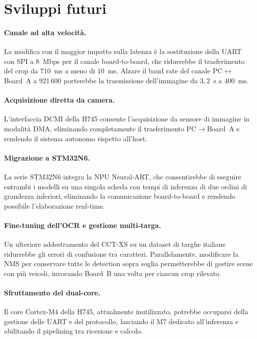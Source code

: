 \section{Sviluppi futuri}
\label{sec:sviluppi-futuri}

\paragraph{Canale ad alta velocità.} La modifica con il maggior impatto sulla latenza è la sostituzione della UART con SPI a $8$~Mbps per il canale board-to-board, che ridurrebbe il trasferimento del crop da $710$~ms a meno di $10$~ms. Alzare il baud rate del canale PC$\leftrightarrow$Board~A a $921\,600$ porterebbe la trasmissione dell'immagine da $3{,}2$~s a $400$~ms.

\paragraph{Acquisizione diretta da camera.} L'interfaccia DCMI della H745 consente l'acquisizione da sensore di immagine in modalità DMA, eliminando completamente il trasferimento PC$\rightarrow$Board~A e rendendo il sistema autonomo rispetto all'host.

\paragraph{Migrazione a STM32N6.} La serie STM32N6 integra la NPU Neural-ART, che consentirebbe di eseguire entrambi i modelli su una singola scheda con tempi di inferenza di due ordini di grandezza inferiori, eliminando la comunicazione board-to-board e rendendo possibile l'elaborazione real-time.

\paragraph{Fine-tuning dell'OCR e gestione multi-targa.} Un ulteriore addestramento del CCT-XS su un dataset di targhe italiane ridurrebbe gli errori di confusione tra caratteri. Parallelamente, modificare la NMS per conservare tutte le detection sopra soglia permetterebbe di gestire scene con più veicoli, invocando Board~B una volta per ciascun crop rilevato.

\paragraph{Sfruttamento del dual-core.} Il core Cortex-M4 della H745, attualmente inutilizzato, potrebbe occuparsi della gestione delle UART e del protocollo, lasciando il M7 dedicato all'inferenza e abilitando il pipelining tra ricezione e calcolo.
